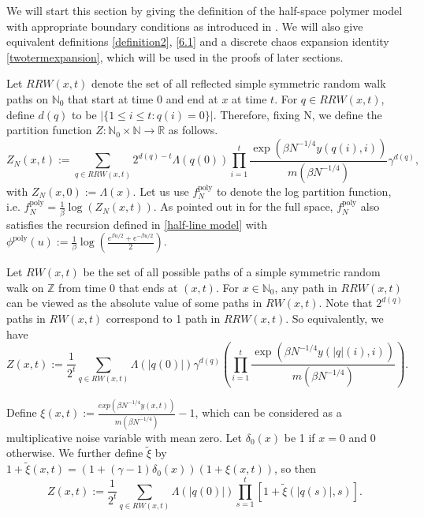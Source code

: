 \documentclass[10pt]{article}
\begin{document}
We will start this section by giving the definition of the half-space polymer model with appropriate boundary conditions as introduced in \cite{Wu20}. We will also give equivalent definitions \eqref{definition2}, \eqref{6.1} and a discrete chaos expansion identity \eqref{twotermexpansion}, which will be used in the proofs of later sections.

Let $RRW(x, t)$ denote the set of all reflected simple symmetric random walk paths on $\mathbb{N}_0$ that start at time 0 and end at $x$ at time $t$.  For $q \in RRW(x,t)$, define $d(q)$ to be $|\{1 \leq i \leq t: q(i)=0\}|$. Therefore, fixing N, we define the partition function  $Z: \mathbb{N}_0 \times \mathbb{N} \rightarrow \mathbb{R}$ as follows.
\begin{equation} \label{definition1}
    Z_N(x, t):= \sum_{q \in RRW(x, t)} 2^{d(q)-t} \Lambda(q(0)) \prod_{i=1}^{t} \frac{\exp \left(\beta N^{-1 / 4} y(q(i), i)\right)}{m(\beta N^{-1 / 4})}  \gamma^{d(q)},
\end{equation}
with $Z_N(x,0):=\Lambda(x)$. Let us use $f^{\text{poly}}_N$ to denote the log partition function, i.e. $f^{\text{poly}}_N=\frac{1}{\beta} \log(Z_N(x, t))$. As pointed out in \cite{adhikari2022invariance} for the full space, $f^{\text{poly}}_N$ also satisfies the recursion defined in \eqref{half-line model} with $\phi^{\text{poly}}(u):=\frac{1}{\beta}\log(\frac{e^{\beta u/2}+e^{-\beta u/2}}{2})$. 


 Let $RW(x,t)$ be the set of all possible paths of a simple symmetric random walk on $\mathbb{Z}$ from time 0 that ends at $(x,t)$. For $x \in \mathbb{N}_0$, any path in $RRW(x,t)$ can be viewed as the absolute value of some paths in $RW(x,t)$. Note that $2^{d(q)}$ paths in $RW(x,t)$ correspond to 1 path in $RRW(x,t)$. So equivalently, we have
\begin{equation} \label{definition2}
    Z(x, t):=\frac{1}{2^{t}} \sum_{q \in RW(x, t)} \Lambda(|q(0)|) \gamma^{d(q)} \left(\prod_{i=1}^{t} \frac{\exp \left(\beta N^{-1 / 4} y(|q|(i), i)\right)}{m\left(\beta N^{-1 / 4}\right)}\right).
\end{equation}


Define $\xi(x,t):=\frac{exp(\beta N^{-1/4} y(x,t))}{m(\beta N^{-1/4})}-1$, which can be considered as a multiplicative noise variable with mean zero. Let $\delta_0(x)$ be 1 if $x=0$ and 0 otherwise. We further define $\tilde{\xi}$ by $1+\tilde{\xi}(x,t)=(1+(\gamma-1)\delta_0(x))(1+\xi(x,t))$, so then
\begin{equation}
    \label{6.1}
    Z(x, t):=\frac{1}{2^{t}} \sum_{q \in R W(x, t)} \Lambda(|q(0)|)\prod_{s=1}^{t}[1+\tilde{\xi}(|q(s)|, s)].
\end{equation}
\end{document}
